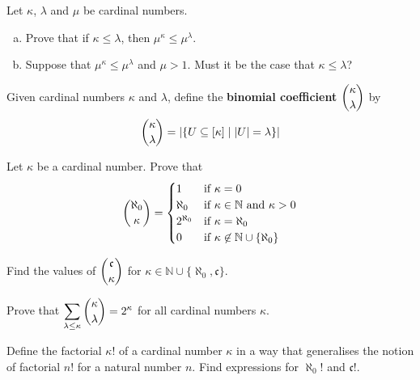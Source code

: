 \begin{chapex}
Let $\kappa$, $\lambda$ and $\mu$ be cardinal numbers.
\begin{enumerate}[(a)]
\item Prove that if $\kappa \le \lambda$, then $\mu^{\kappa} \le \mu^{\lambda}$.
\item Suppose that $\mu^{\kappa} \le \mu^{\lambda}$ and $\mu > 1$. Must it be the case that $\kappa \le \lambda$?
\end{enumerate}
\end{chapex}

\begin{definition}
Given cardinal numbers $\kappa$ and $\lambda$, define the \textbf{binomial coefficient} $\dbinom{\kappa}{\lambda}$ by
\[ \dbinom{\kappa}{\lambda} = |\{ U \subseteq [\kappa] \mid |U| = \lambda \}| \]
\end{definition}

\begin{chapex}
Let $\kappa$ be a cardinal number. Prove that
\[ \dbinom{\aleph_0}{\kappa} = \begin{cases} 1 & \text{if } \kappa = 0 \\ \aleph_0 & \text{if } \kappa \in \mathbb{N} \text{ and } \kappa > 0 \\ 2^{\aleph_0} & \text{if } \kappa = \aleph_0 \\ 0 & \text{if } \kappa \not\in \mathbb{N} \cup \{ \aleph_0 \} \end{cases} \]
\end{chapex}

\begin{chapex}
Find the values of $\dbinom{\mathfrak{c}}{\kappa}$ for $\kappa \in \mathbb{N} \cup \{ \aleph_0, \mathfrak{c} \}$.
\end{chapex}

\begin{chapex}
Prove that $\displaystyle \sum_{\lambda \le \kappa} \dbinom{\kappa}{\lambda} = 2^{\kappa}$ for all cardinal numbers $\kappa$.
\end{chapex}

\begin{chapex}
\label{cqFactorialOfCardinalNumber}
Define the factorial $\kappa !$ of a cardinal number $\kappa$ in a way that generalises the notion of factorial $n!$ for a natural number $n$. Find expressions for $\aleph_0!$ and $\mathfrak{c}!$.
\end{chapex}

